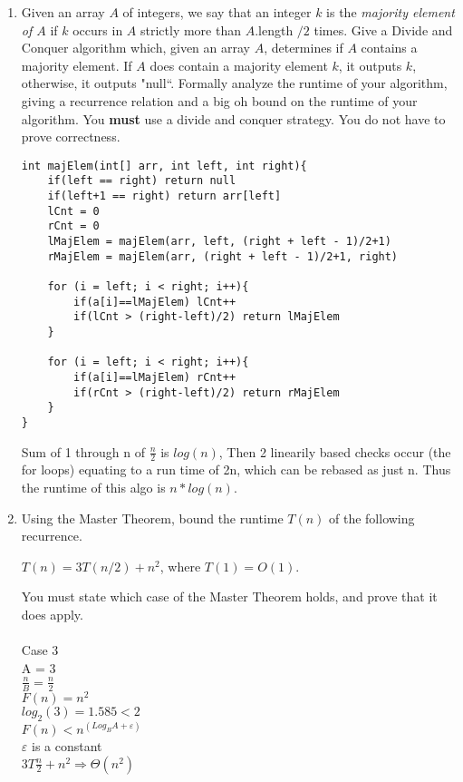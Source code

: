 \documentclass[11pt]{amsart}
\begin{document}
\begin{enumerate}
\bigskip

\item Given an array $A$ of integers, we say that an integer $k$ is the \textit{majority element of $A$} if $k$ occurs in $A$ strictly more than $A$.length $/2$ times. Give a Divide and Conquer algorithm which, given an array $A$, determines if $A$ contains a majority element. If $A$ does contain a majority element $k$, it outputs $k$, otherwise, it outputs "null``. Formally analyze the runtime of your algorithm, giving a recurrence relation and a big oh bound on the runtime of your algorithm. You \textbf{must} use a divide and conquer strategy. You do not have to prove correctness.

\smallskip

\begin{lstlisting}
int majElem(int[] arr, int left, int right){
	if(left == right) return null
	if(left+1 == right) return arr[left]
	lCnt = 0
	rCnt = 0
	lMajElem = majElem(arr, left, (right + left - 1)/2+1)
	rMajElem = majElem(arr, (right + left - 1)/2+1, right)

	for (i = left; i < right; i++){
		if(a[i]==lMajElem) lCnt++
		if(lCnt > (right-left)/2) return lMajElem
	}

	for (i = left; i < right; i++){
		if(a[i]==lMajElem) rCnt++
		if(rCnt > (right-left)/2) return rMajElem
	}	
}
\end{lstlisting}
Sum of 1 through n of $\frac{n}{2}$ is $log(n)$, Then 2 linearily based checks occur (the for loops) equating to a run time of 2n, which can be rebased as just n. Thus the runtime of this algo is $n * log(n)$. 
\bigskip

\item Using the Master Theorem, bound the runtime $T(n)$ of the following recurrence. 
\begin{center}
$T(n) = 3T(n/2) + n^2$, where $T(1) = O(1)$.
\end{center}
You must state which case of the Master Theorem holds, and prove that it does apply.
\\\\
Case 3\\
A = 3\\
$\frac{n}{B} = \frac{n}{2}$\\
$F(n) = n^2$\\
$log_2(3) = 1.585 < 2$\\
$F(n) < n^(Log_B A + \varepsilon)$\\
$\varepsilon$ is a constant\\
$3T\frac{n}{2} + n^2 \Rightarrow \Theta(n^2)$
\bigskip


\end{enumerate}
\end{document}
